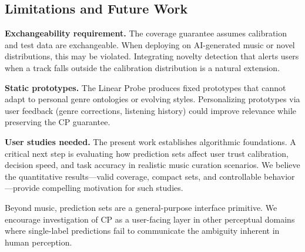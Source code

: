 \subsection{Limitations and Future Work}

\textbf{Exchangeability requirement.} The coverage guarantee assumes calibration
and test data are exchangeable. When deploying on AI-generated music or novel
distributions, this may be violated. Integrating novelty detection that alerts
users when a track falls outside the calibration distribution is a natural
extension.

\textbf{Static prototypes.} The Linear Probe produces fixed prototypes that
cannot adapt to personal genre ontologies or evolving styles. Personalizing
prototypes via user feedback (genre corrections, listening history) could
improve relevance while preserving the CP guarantee.

\textbf{User studies needed.} The present work establishes algorithmic
foundations. A critical next step is evaluating how prediction sets affect user
trust calibration, decision speed, and task accuracy in realistic music curation
scenarios. We believe the quantitative results---valid coverage, compact sets,
and controllable behavior---provide compelling motivation for such studies.

Beyond music, prediction sets are a general-purpose interface primitive. We
encourage investigation of CP as a user-facing layer in other perceptual domains
where single-label predictions fail to communicate the ambiguity inherent in
human perception.
